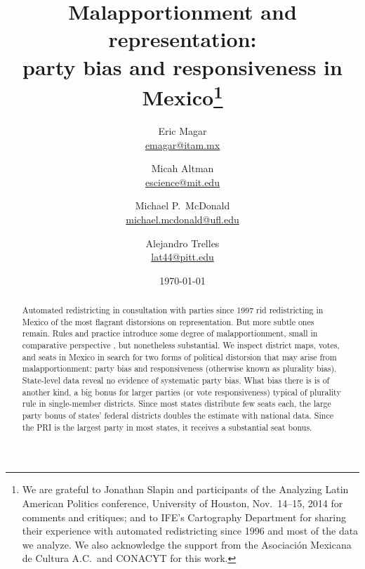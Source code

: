 \documentclass[letter,12pt]{article}
\begin{document}
\title{Malapportionment and representation: \\ party bias and responsiveness in Mexico\thanks{We are grateful to Jonathan Slapin and participants of the Analyzing Latin American Politics conference, University of Houston, Nov.~14--15, 2014 for comments and critiques; and to IFE's Cartography Department for sharing their experience with automated redistricting since 1996 and most of the data we analyze. We also acknowledge the support from the Asociaci\'on Mexicana de Cultura A.C.\ and CONACYT for this work.}}
\author{Eric Magar \\ {\footnotesize \url{emagar@itam.mx}} \and
        Micah Altman \\ {\footnotesize \url{escience@mit.edu}} \and
        Michael P.~McDonald \\ {\footnotesize \url{michael.mcdonald@ufl.edu}} \and  %
        Alejandro Trelles \\ {\footnotesize \url{lat44@pitt.edu}}
      }
\date{\today}
\maketitle

\begin{abstract}
\noindent Automated redistricting in consultation with parties since 1997 rid redistricting in Mexico of the most flagrant distorsions on representation. But more subtle ones remain. Rules and practice introduce some degree of malapportionment, small in comparative perspective \citep{samuels.snyder.2001}, but nonetheless substantial. We inspect district maps, votes, and seats in Mexico in search for two forms of political distorsion that may arise from malapportionment: party bias and responsiveness (otherwise known as plurality bias). State-level data reveal no evidence of systematic party bias. What bias there is is of another kind, a big bonus for larger parties (or vote responsiveness) typical of plurality rule in single-member districts. Since most states distribute few seats each, the large party bonus of states' federal districts doubles the estimate with national data. Since the PRI is the largest party in most states, it receives a substantial seat bonus.
\end{abstract}
\end{document}
